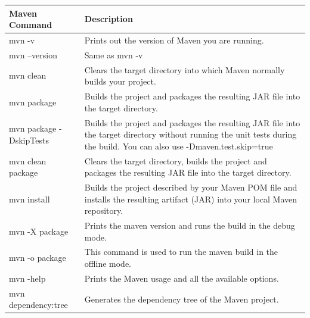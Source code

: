 \begin{tabularx}{\textwidth}{ |l|X| } 
\hline
\textbf{Maven Command}	& \textbf{Description} \\
\hline
mvn -v	& Prints out the version of Maven you are running.\\ 
mvn --version & Same as mvn -v\\
mvn clean	& Clears the target directory into which Maven normally builds your project.\\
mvn package & Builds the project and packages the resulting JAR file into the target directory.\\
mvn package -DskipTests &	Builds the project and packages the resulting JAR file into the target directory without running the unit tests during the build. You can also use -Dmaven.test.skip=true\\
mvn clean package &	Clears the target directory,  builds the project and packages the resulting JAR file into the target directory.\\
mvn install & Builds the project described by your Maven POM file and installs the resulting artifact (JAR) into your local Maven repository.\\
mvn -X package & Prints the maven version and runs the build in the debug mode. \\
mvn -o package & This command is used to run the maven build in the offline mode.\\
mvn -help & Prints the Maven usage and all the available options.\\
mvn dependency:tree & Generates the dependency tree of the Maven project.\\
\hline
\end{tabularx}

